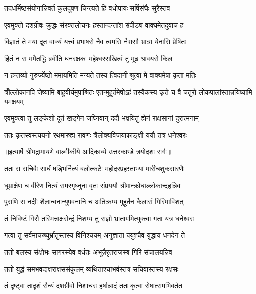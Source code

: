\twolineshloka
{तदधर्मिष्ठसंयोगान्निवर्त कुलदूषण}
{चिन्त्यते हि वधोपायः सर्षिसंघैः सुरैस्तव} %

\twolineshloka
{एवमुक्तो दशग्रीवः क्रुद्धः संरक्तलोचनः}
{हस्तान्दन्तांश संपीड्य वाक्यमेतदुवाच ह} %

\twolineshloka
{विज्ञातं ते मया दूत वाक्यं यत्त्वं प्रभाषसे}
{नैव त्वमसि नैवासौ भ्रात्रा येनासि प्रेषितः} %

\twolineshloka
{हितं न स ममैतद्धि ब्रवीति धनरक्षकः}
{महेश्वरसखित्वं तु मूढ श्रावयसे किल} %

\twolineshloka
{न हन्तव्यो गुरुर्ज्येष्ठो ममायमिति मन्यते}
{तस्य त्विदानीं श्रुत्वा मे वाक्यमेषा कृता मतिः} %

\threelineshloka
{त्रीँल्लोकानपि जेष्यामि बाहुवीर्यमुपाश्रितः}
{एतन्मुहूर्तमेषोऽहं तस्यैकस्य कृते च वै}
{चतुरो लोकपालांस्तान्नयिष्यामि यमक्षयम्} %

\twolineshloka
{एवमुक्त्वा तु लङ्केशो दूतं खड्गेन जघ्निवान्}
{ददौ भक्षयितुं ह्येनं राक्षसानां दुरात्मनाम्} %

\twolineshloka
{ततः कृतस्वस्त्ययनो रथमारुह्य रावणः}
{त्रैलोक्यविजयाकाङ्क्षी ययौ तत्र धनेश्वरः} %


{॥इत्यार्षे श्रीमद्रामायणे वाल्मीकीये आदिकाव्ये उत्तरकाण्डे त्रयोदशः सर्गः॥}


\twolineshloka
{ततः स सचिवैः सार्धं षड्भिर्नित्यं बलोत्कटैः}
{महोदरप्रहस्ताभ्यां मारीचशुकसारणैः} %

\twolineshloka
{धूम्राक्षेण च वीरेण नित्यं समरगृध्नुना}
{वृतः संप्रययौ श्रीमान्क्रोधाल्लोकान्दहन्निव} %

\twolineshloka
{पुराणि स नदीः शैलान्वनान्युपवनानि च}
{अतिक्रम्य मुहूर्तेन कैलासं गिरिमाविशत्} %

\twolineshloka
{तं निविष्टं गिरौ तस्मिन्राक्षसेन्द्रं निशम्य तु}
{राज्ञो भ्रातायमित्युक्त्वा गता यत्र धनेश्वरः} %

\twolineshloka
{गत्वा तु सर्वमाचख्युर्भ्रातुस्तस्य विनिश्चयम्}
{अनुज्ञाता ययुश्चैव युद्धाय धनदेन ते} %

\twolineshloka
{ततो बलस्य संक्षोभः सागरस्येव वर्धतः}
{अभून्नैरृतराजस्य गिरिं संचालयन्निव} %

\twolineshloka
{ततो युद्धं समभवद्यक्षराक्षससंकुलम्}
{व्यथिताश्चाभवंस्तत्र सचिवास्तस्य रक्षसः} %

\twolineshloka
{तं दृष्ट्वा तादृशं सैन्यं दशग्रीवो निशाचरः}
{हर्षान्नादं ततः कृत्वा रोषात्समभिवर्तत} %

